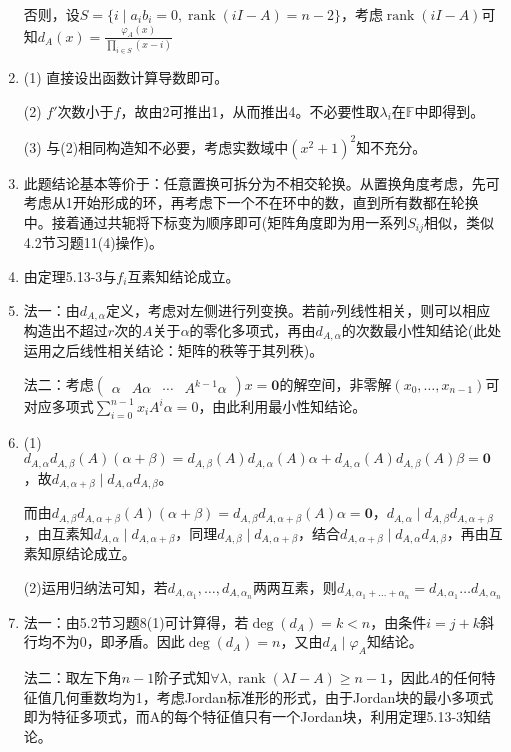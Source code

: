 \documentclass[a4paper,UTF8,fontset=windows]{ctexart}
\DeclareMathOperator{\rank}{rank}
\begin{document}
\begin{enumerate}
否则，设$S=\{i\mid a_ib_i=0,\rank(iI-A)=n-2\}$，考虑$\rank(iI-A)$可知$d_A(x)=\frac{\varphi_A(x)}{\prod_{i\in S}(x-i)}$

\item
(1) 直接设出函数计算导数即可。

(2) $f'$次数小于$f$，故由2可推出1，从而推出4。不必要性取$\lambda_i$在$\mathbb{F}$中即得到。

(3) 与(2)相同构造知不必要，考虑实数域中$(x^2+1)^2$知不充分。

\item
此题结论基本等价于：任意置换可拆分为不相交轮换。从置换角度考虑，先可考虑从1开始形成的环，再考虑下一个不在环中的数，直到所有数都在轮换中。接着通过共轭将下标变为顺序即可(矩阵角度即为用一系列$S_{ij}$相似，类似4.2节习题11(4)操作)。

\item
由定理5.13-3与$f_i$互素知结论成立。

\item
法一：由$d_{A,\alpha}$定义，考虑对左侧进行列变换。若前$r$列线性相关，则可以相应构造出不超过$r$次的$A$关于$\alpha$的零化多项式，再由$d_{A,\alpha}$的次数最小性知结论(此处运用之后线性相关结论：矩阵的秩等于其列秩)。

法二：考虑$\begin{pmatrix}\alpha&A\alpha&\cdots&A^{k-1}\alpha\end{pmatrix}x=\mathbf{0}$的解空间，非零解$(x_0,\dots,x_{n-1})$可对应多项式$\sum_{i=0}^{n-1}x_iA^i\alpha=0$，由此利用最小性知结论。

\item
(1)$d_{A,\alpha}d_{A,\beta}(A)(\alpha+\beta)=d_{A,\beta}(A)d_{A,\alpha}(A)\alpha+d_{A,\alpha}(A)d_{A,\beta}(A)\beta=\mathbf{0}$，故$d_{A,\alpha+\beta}\mid d_{A,\alpha}d_{A,\beta}$。

而由$d_{A,\beta}d_{A,\alpha+\beta}(A)(\alpha+\beta)=d_{A,\beta}d_{A,\alpha+\beta}(A)\alpha=\mathbf{0}$，$d_{A,\alpha}\mid d_{A,\beta}d_{A,\alpha+\beta}$，由互素知$d_{A,\alpha}\mid d_{A,\alpha+\beta}$，同理$d_{A,\beta}\mid d_{A,\alpha+\beta}$，结合$d_{A,\alpha+\beta}\mid d_{A,\alpha}d_{A,\beta}$，再由互素知原结论成立。

(2)运用归纳法可知，若$d_{A,\alpha_1},\dots,d_{A,\alpha_n}$两两互素，则$d_{A,\alpha_1+\dots+\alpha_n}=d_{A,\alpha_1}\dots d_{A,\alpha_n}$

\item
法一：由5.2节习题8(1)可计算得，若$\deg(d_A)=k<n$，由条件$i=j+k$斜行均不为0，即矛盾。因此$\deg(d_A)=n$，又由$d_A\mid \varphi_A$知结论。

法二：取左下角$n-1$阶子式知$\forall\lambda,\rank(\lambda I-A)\ge n-1$，因此$A$的任何特征值几何重数均为1，考虑Jordan标准形的形式，由于Jordan块的最小多项式即为特征多项式，而A的每个特征值只有一个Jordan块，利用定理5.13-3知结论。


\end{enumerate}
\end{document}
